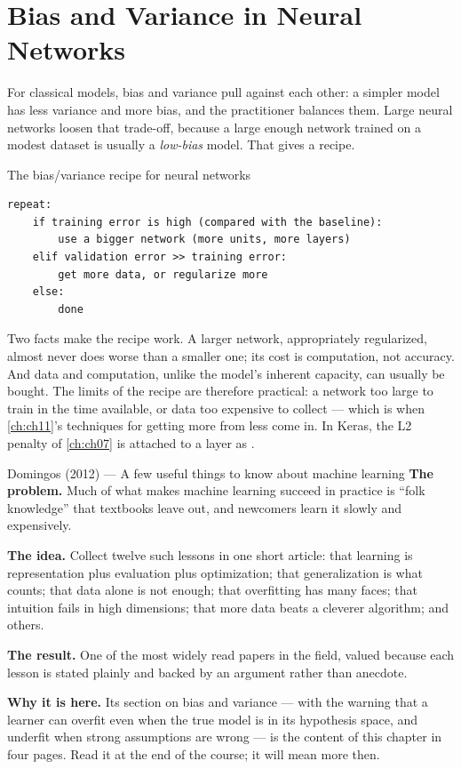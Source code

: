 \section{Bias and Variance in Neural Networks}
\label{sec:nn-bv}

For classical models, bias and variance pull against each other: a simpler model
has less variance and more bias, and the practitioner balances them. Large
neural networks loosen that trade-off, because a large enough network trained on
a modest dataset is usually a \emph{low-bias} model. That gives a recipe.

\begin{algorithmbox}{The bias/variance recipe for neural networks}
\begin{lstlisting}[style=pseudocode]
repeat:
    if training error is high (compared with the baseline):
        use a bigger network (more units, more layers)
    elif validation error >> training error:
        get more data, or regularize more
    else:
        done
\end{lstlisting}
\end{algorithmbox}

Two facts make the recipe work. A larger network, appropriately regularized,
almost never does worse than a smaller one; its cost is computation, not
accuracy. And data and computation, unlike the model's inherent capacity, can
usually be bought. The limits of the recipe are therefore practical: a network
too large to train in the time available, or data too expensive to collect ---
which is when \cref{ch:ch11}'s techniques for getting more from less come in.
In Keras, the L2 penalty of \cref{ch:ch07} is attached to a layer as
.

\begin{researchspotlight}{Domingos (2012) --- A few useful things to know about machine learning}
\textbf{The problem.} Much of what makes machine learning succeed in practice is
``folk knowledge'' that textbooks leave out, and newcomers learn it slowly and
expensively.

\textbf{The idea.} Collect twelve such lessons in one short article: that
learning is representation plus evaluation plus optimization; that
generalization is what counts; that data alone is not enough; that overfitting
has many faces; that intuition fails in high dimensions; that more data beats a
cleverer algorithm; and others.

\textbf{The result.} One of the most widely read papers in the field, valued
because each lesson is stated plainly and backed by an argument rather than
anecdote.

\textbf{Why it is here.} Its section on bias and variance --- with the warning
that a learner can overfit even when the true model is in its hypothesis space,
and underfit when strong assumptions are wrong --- is the content of this
chapter in four pages. Read it at the end of the course; it will mean more then.
\parencite{domingos2012}
\end{researchspotlight}

